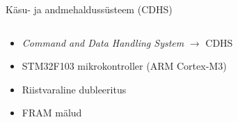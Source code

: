 \documentclass[pdf]{beamer}
\begin{document}
\begin{frame}{Käsu- ja andmehaldussüsteem (CDHS)}
    \begin{columns}
        \begin{column}{0.5\textwidth}
            \begin{itemize}
                \item \textit{Command and Data Handling System} \(\to\) CDHS
                \item STM32F103 mikrokontroller (ARM Cortex-M3)
                \item Riistvaraline dubleeritus
                \item FRAM mälud
            \end{itemize}
        \end{column}
        \begin{column}{0.5\textwidth}
        \end{column}
    \end{columns}
\end{frame}
\end{document}
